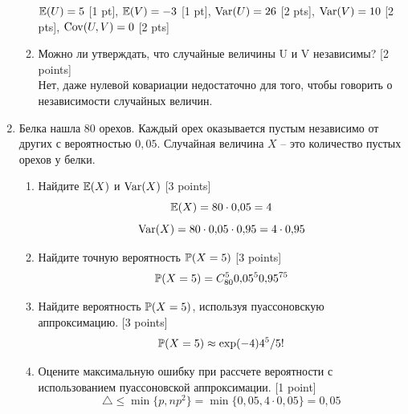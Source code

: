 \documentclass[12pt, a4paper]{article}\usepackage[]{graphicx}\usepackage[]{color}
\begin{document}
\begin{enumerate}
\begin{enumerate}
				$\E(U)=5$ [1 pt], $\E(V)=-3$ [1 pt], $\Var(U)=26$ [2 pts], $\Var(V)=10$ [2 pts], $\Cov(U,V)=0$ [2 pts]
				\item Можно ли утверждать, что случайные величины U и V независимы? [2 points]\\
				Нет, даже нулевой ковариации недостаточно для того, чтобы говорить о независимости случайных величин.
			\end{enumerate}



			\item Белка нашла 80 орехов. Каждый орех оказывается пустым независимо от других с вероятностью $0{,}05$. Случайная величина $X$ -- это количество пустых орехов у белки.
			\begin{enumerate}
				\item Найдите $\E(X)$ и $\Var(X)$ [3 points]
				\begin{equation}
				\E(X)=80\cdot 0{,}05=4
				\end{equation}
				\begin{equation}
				\Var(X)=80\cdot 0{,}05\cdot 0{,}95=4\cdot 0{,}95
				\end{equation}
				\item Найдите точную вероятность $\P(X=5)$ [3 points]
				\begin{equation}
				\P(X=5)=C_{80}^{5}0{,}05^{5}0{,}95^{75}
				\end{equation}
				\item Найдите вероятность $\P(X=5)$, используя пуассоновскую аппроксимацию. [3 points]
				\begin{equation}
				\P(X=5)\approx \exp(-4)4^5/5!
				\end{equation}
				\item Оцените максимальную ошибку при рассчете вероятности с использованием пуассоновской аппроксимации. [1 point]
				\begin{equation}
				\triangle\leq \min\{p,np^2\}=\min\{0{,}05,4\cdot 0{,}05\}=0{,}05
				\end{equation}
			\end{enumerate}





\end{enumerate}
\end{document}
